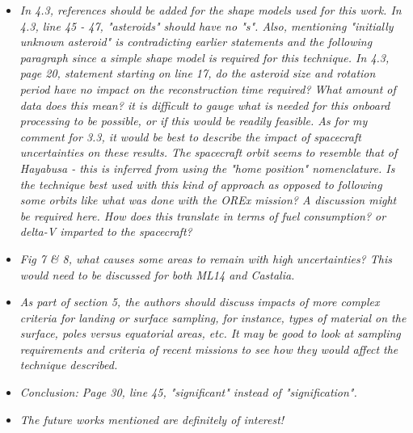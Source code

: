 \documentclass[11pt]{article}
\newcommand{\comment}[1]{\item \itshape #1 \normalfont}
\begin{document}
\begin{itemize}
\comment{
In 4.3, references should be added for the shape models used for this work.
In 4.3, line 45 - 47, "asteroids" should have no "s". Also, mentioning "initially unknown asteroid" is contradicting earlier statements and the following paragraph since a simple shape model is required for this technique.
In 4.3, page 20, statement starting on line 17, do the asteroid size and rotation period have no impact on the reconstruction time required? What amount of data does this mean? it is difficult to gauge what is needed for this onboard processing to be possible, or if this would be readily feasible.
As for my comment for 3.3, it would be best to describe the impact of spacecraft uncertainties on these results.
The spacecraft orbit seems to resemble that of Hayabusa - this is inferred from using the "home position" nomenclature. Is the technique best used with this kind of approach as opposed to following some orbits like what was done with the OREx mission? A discussion might be required here.
How does this translate in terms of fuel consumption? or delta-V imparted to the spacecraft?  
}

\comment{
Fig 7 \& 8, what causes some areas to remain with high uncertainties? This would need to be discussed for both ML14 and Castalia.
}

\comment{
As part of section 5, the authors should discuss impacts of more complex criteria for landing or surface sampling, for instance, types of material on the surface, poles versus equatorial areas, etc. It may be good to look at sampling requirements and criteria of recent missions to see how they would affect the technique described.
}

\comment{
Conclusion:
Page 30, line 45, "significant" instead of "signification".
}

\comment{
The future works mentioned are definitely of interest!
}

\end{itemize}
\end{document}
